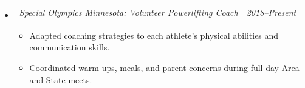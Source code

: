\documentclass[12pt,letterpaper]{article}
\makeatletter
\newcommand{\headerpair}[2]{
    \begin{tabular*}{\linewidth}{l@{ \extracolsep{\fill} }r} {\large\emph{#1}} & {\large\emph{#2}}
    \end{tabular*}
}
\newcommand{\headerrow}[3]{\headerpair{#2: #1}{#3}}
\newcommand{\CPP}{C\nolinebreak[4]\hspace{-.05em}\raisebox{.22ex}{\footnotesize\bf ++}\xspace}
\makeatother
\begin{document}
\begin{itemize}[leftmargin=\parindent]
\begin{itemize}[leftmargin=\parindent]

        \end{itemize}

    \item[]
        \headerrow
            {Volunteer Powerlifting Coach}
            {Special Olympics Minnesota}
            {2018--Present}
        \begin{itemize}[leftmargin=\parindent]

            \item Adapted coaching strategies to each athlete's physical abilities and communication skills.

            \item Coordinated warm-ups, meals, and parent concerns during full-day Area and State meets.


\end{itemize}
\end{itemize}
\end{document}
